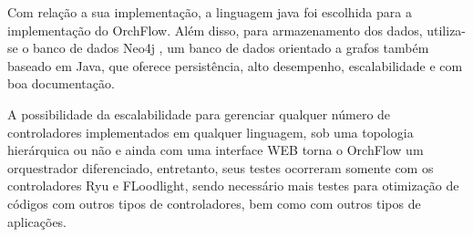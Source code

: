 Com relação a sua implementação, a linguagem java foi escolhida para a implementação do OrchFlow. Além disso, para armazenamento dos dados, utiliza-se o banco de dados Neo4j \cite{neo}, um banco de dados orientado a grafos também baseado em Java, que oferece persistência, alto desempenho, escalabilidade e com boa documentação. 
\par A possibilidade da escalabilidade para gerenciar qualquer número de controladores implementados em qualquer linguagem, sob uma topologia hierárquica ou não e ainda com uma interface WEB torna o OrchFlow um orquestrador diferenciado, entretanto, seus testes ocorreram somente com os controladores Ryu e FLoodlight, sendo necessário mais testes para otimização de códigos com outros tipos de controladores, bem como com outros tipos de aplicações.












